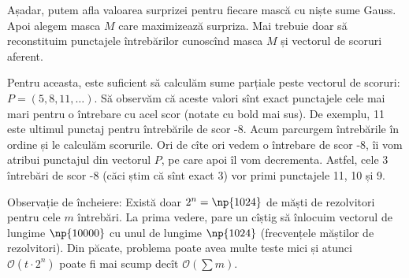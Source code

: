 Așadar, putem afla valoarea surprizei pentru fiecare mască cu niște sume Gauss. Apoi alegem masca $M$ care maximizează surpriza. Mai trebuie doar să reconstituim punctajele întrebărilor cunoscînd masca $M$ și vectorul de scoruri aferent.

Pentru aceasta, este suficient să calculăm sume parțiale peste vectorul de scoruri: $P=(5, 8, 11, \dots)$. Să observăm că aceste valori sînt exact punctajele cele mai mari pentru o întrebare cu acel scor (notate cu bold mai sus). De exemplu, 11 este ultimul punctaj pentru întrebările de scor -8. Acum parcurgem întrebările în ordine și le calculăm scorurile. Ori de cîte ori vedem o întrebare de scor -8, îi vom atribui punctajul din vectorul $P$, pe care apoi îl vom decrementa. Astfel, cele 3 întrebări de scor -8 (căci știm că sînt exact 3) vor primi punctajele 11, 10 și 9.

Observație de încheiere: Există doar $2^n = \np{1024}$ de măști de rezolvitori pentru cele $m$ întrebări. La prima vedere, pare un cîștig să înlocuim vectorul de lungime $\np{10000}$ cu unul de lungime $\np{1024}$ (frecvențele măștilor de rezolvitori). Din păcate, problema poate avea multe teste mici și atunci $\mathcal{O}(t \cdot 2^n)$ poate fi mai scump decît $\mathcal{O}(\sum m)$.
